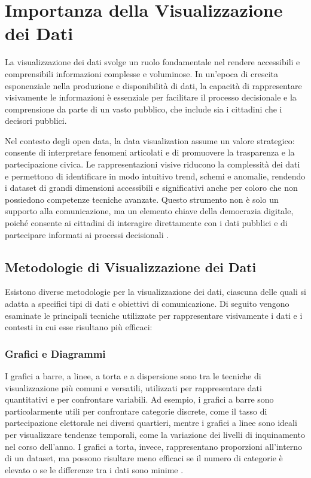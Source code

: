 \section{Importanza della Visualizzazione dei Dati}

La visualizzazione dei dati svolge un ruolo fondamentale nel rendere accessibili e comprensibili informazioni complesse e voluminose. In un’epoca di crescita esponenziale nella produzione e disponibilità di dati, la capacità di rappresentare visivamente le informazioni è essenziale per facilitare il processo decisionale e la comprensione da parte di un vasto pubblico, che include sia i cittadini che i decisori pubblici.

Nel contesto degli open data, la data visualization assume un valore strategico: consente di interpretare fenomeni articolati e di promuovere la trasparenza e la partecipazione civica. Le rappresentazioni visive riducono la complessità dei dati e permettono di identificare in modo intuitivo trend, schemi e anomalie, rendendo i dataset di grandi dimensioni accessibili e significativi anche per coloro che non possiedono competenze tecniche avanzate. Questo strumento non è solo un supporto alla comunicazione, ma un elemento chiave della democrazia digitale, poiché consente ai cittadini di interagire direttamente con i dati pubblici e di partecipare informati ai processi decisionali \cite{Few2013, Davies2019}.

\subsection{Metodologie di Visualizzazione dei Dati}

Esistono diverse metodologie per la visualizzazione dei dati, ciascuna delle quali si adatta a specifici tipi di dati e obiettivi di comunicazione. Di seguito vengono esaminate le principali tecniche utilizzate per rappresentare visivamente i dati e i contesti in cui esse risultano più efficaci:

\subsubsection{Grafici e Diagrammi}
I grafici a barre, a linee, a torta e a dispersione sono tra le tecniche di visualizzazione più comuni e versatili, utilizzati per rappresentare dati quantitativi e per confrontare variabili. Ad esempio, i grafici a barre sono particolarmente utili per confrontare categorie discrete, come il tasso di partecipazione elettorale nei diversi quartieri, mentre i grafici a linee sono ideali per visualizzare tendenze temporali, come la variazione dei livelli di inquinamento nel corso dell'anno. I grafici a torta, invece, rappresentano proporzioni all’interno di un dataset, ma possono risultare meno efficaci se il numero di categorie è elevato o se le differenze tra i dati sono minime \cite{Few2013}.

